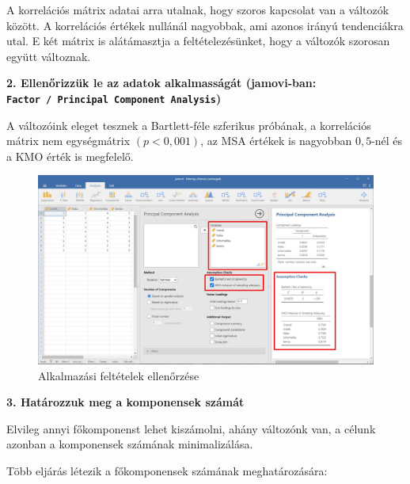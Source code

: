 \documentclass[
  letterpaper,
]{krantz}
\begin{document}
A korrelációs mátrix adatai arra utalnak, hogy szoros kapcsolat van a
változók között. A korrelációs értékek nullánál nagyobbak, ami azonos
irányú tendenciákra utal. E két mátrix is alátámasztja a
feltételezésünket, hogy a változók szorosan együtt változnak.

\textbf{2. Ellenőrizzük le az adatok alkalmasságát (jamovi-ban:
\texttt{Factor\ /\ Principal\ Component\ Analysis})}

A változóink eleget tesznek a Bartlett-féle szferikus próbának, a
korrelációs mátrix nem egységmátrix \((p<0,001)\), az MSA értékek is
nagyobban \(0,5\)-nél és a KMO érték is megfelelő.

\begin{figure}

{\centering \includegraphics{./images/fokomponens_kep_02.jpg}

}

\caption{Alkalmazási feltételek ellenőrzése}

\end{figure}

\textbf{3. Határozzuk meg a komponensek számát}

Elvileg annyi főkomponenst lehet kiszámolni, ahány változónk van, a
célunk azonban a komponensek számának minimalizálása.

Több eljárás létezik a főkomponensek számának meghatározására:
\end{document}
